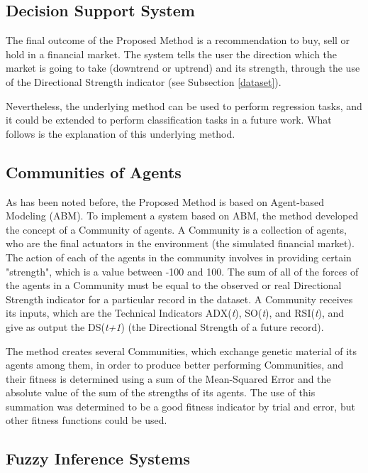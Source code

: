\subsection{Decision Support System}

The final outcome of the Proposed Method is a recommendation to buy, sell or hold in a financial market. The system tells the user the direction which the market is going to take (downtrend or uptrend) and its strength, through the use of the Directional Strength indicator (see Subsection \ref{dataset}).

Nevertheless, the underlying method can be used to perform regression tasks, and it could be extended to perform classification tasks in a future work. What follows is the explanation of this underlying method.

\subsection{Communities of Agents}
\label{communities-of-agents}

As has been noted before, the Proposed Method is based on Agent-based Modeling (ABM). To implement a system based on ABM, the method developed the concept of a Community of agents. A Community is a collection of agents, who are the final actuators in the environment (the simulated financial market). The action of each of the agents in the community involves in providing certain "strength", which is a value between -100 and 100. The sum of all of the forces of the agents in a Community must be equal to the observed or real Directional Strength indicator for a particular record in the dataset. A Community receives its inputs, which are the Technical Indicators ADX(\textit{t}), SO(\textit{t}), and RSI(\textit{t}), and give as output the DS(\textit{t+1}) (the Directional Strength of a future record).

The method creates several Communities, which exchange genetic material of its agents among them, in order to produce better performing Communities, and their fitness is determined using a sum of the Mean-Squared Error and the absolute value of the sum of the strengths of its agents. The use of this summation was determined to be a good fitness indicator by trial and error, but other fitness functions could be used.

\subsection{Fuzzy Inference Systems}

